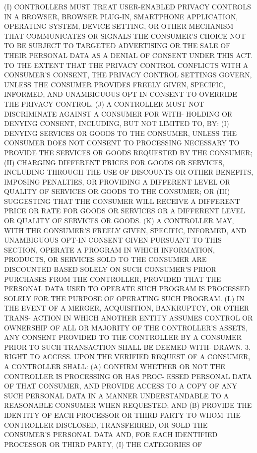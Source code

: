    (I) CONTROLLERS MUST TREAT USER-ENABLED PRIVACY CONTROLS IN A BROWSER,
 BROWSER   PLUG-IN,  SMARTPHONE  APPLICATION,  OPERATING  SYSTEM,  DEVICE
 SETTING, OR OTHER MECHANISM THAT COMMUNICATES OR SIGNALS THE  CONSUMER'S
 CHOICE  NOT  TO  BE SUBJECT TO TARGETED ADVERTISING OR THE SALE OF THEIR
 PERSONAL  DATA AS A DENIAL OF CONSENT UNDER THIS ACT. TO THE EXTENT THAT
 THE PRIVACY CONTROL CONFLICTS WITH A  CONSUMER'S  CONSENT,  THE  PRIVACY
 CONTROL  SETTINGS  GOVERN,  UNLESS  THE  CONSUMER PROVIDES FREELY GIVEN,
 SPECIFIC, INFORMED, AND  UNAMBIGUOUS  OPT-IN  CONSENT  TO  OVERRIDE  THE
 PRIVACY CONTROL.
   (J)  A  CONTROLLER  MUST NOT DISCRIMINATE AGAINST A CONSUMER FOR WITH-
 HOLDING OR DENYING CONSENT, INCLUDING, BUT NOT LIMITED TO, BY:
   (I) DENYING SERVICES OR GOODS TO THE  CONSUMER,  UNLESS  THE  CONSUMER
 DOES  NOT  CONSENT  TO  PROCESSING  NECESSARY TO PROVIDE THE SERVICES OR
 GOODS REQUESTED BY THE CONSUMER;
   (II) CHARGING  DIFFERENT  PRICES  FOR  GOODS  OR  SERVICES,  INCLUDING
 THROUGH  THE  USE OF DISCOUNTS OR OTHER BENEFITS, IMPOSING PENALTIES, OR
 PROVIDING A DIFFERENT LEVEL OR QUALITY  OF  SERVICES  OR  GOODS  TO  THE
 CONSUMER; OR
   (III)  SUGGESTING  THAT THE CONSUMER WILL RECEIVE A DIFFERENT PRICE OR
 RATE FOR GOODS OR SERVICES OR A DIFFERENT LEVEL OR QUALITY  OF  SERVICES
 OR GOODS.
   (K)  A  CONTROLLER  MAY,  WITH  THE CONSUMER'S FREELY GIVEN, SPECIFIC,
 INFORMED, AND UNAMBIGUOUS OPT-IN CONSENT GIVEN PURSUANT TO THIS SECTION,
 OPERATE A PROGRAM IN WHICH INFORMATION, PRODUCTS, OR  SERVICES  SOLD  TO
 THE  CONSUMER  ARE  DISCOUNTED  BASED  SOLELY  ON  SUCH CONSUMER'S PRIOR
 PURCHASES FROM THE CONTROLLER, PROVIDED THAT THE PERSONAL DATA  USED  TO
 OPERATE  SUCH  PROGRAM  IS PROCESSED SOLELY FOR THE PURPOSE OF OPERATING
 SUCH PROGRAM.
   (L) IN THE EVENT OF A MERGER, ACQUISITION, BANKRUPTCY, OR OTHER TRANS-
 ACTION IN WHICH ANOTHER ENTITY ASSUMES CONTROL OR OWNERSHIP  OF  ALL  OR
 MAJORITY  OF  THE  CONTROLLER'S  ASSETS,  ANY  CONSENT  PROVIDED  TO THE
 CONTROLLER BY A CONSUMER PRIOR TO SUCH TRANSACTION SHALL BE DEEMED WITH-
 DRAWN.
   3. RIGHT TO ACCESS.  UPON  THE  VERIFIED  REQUEST  OF  A  CONSUMER,  A
 CONTROLLER SHALL:
   (A)  CONFIRM  WHETHER OR NOT THE CONTROLLER IS PROCESSING OR HAS PROC-
 ESSED PERSONAL DATA OF THAT CONSUMER, AND PROVIDE ACCESS TO  A  COPY  OF
 ANY  SUCH  PERSONAL  DATA  IN  A  MANNER  UNDERSTANDABLE TO A REASONABLE
 CONSUMER WHEN REQUESTED; AND
   (B) PROVIDE THE IDENTITY OF EACH PROCESSOR OR THIRD PARTY TO WHOM  THE
 CONTROLLER  DISCLOSED, TRANSFERRED, OR SOLD THE CONSUMER'S PERSONAL DATA
 AND, FOR EACH IDENTIFIED PROCESSOR OR THIRD PARTY, (I) THE CATEGORIES OF
